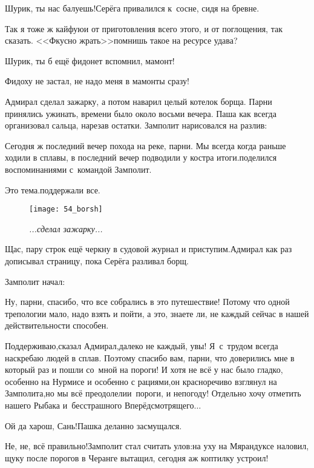 \diagdash Шурик, ты нас балуешь!\mdash Серёга привалился к~сосне, сидя на бревне.

\diagdash Так я тоже ж кайфую\mdash и от приготовления всего этого, и от поглощения, так сказать. <<Фкусно жрать>>\mdash помнишь такое на ресурсе удава?

\diagdash Шурик, ты б ещё фидонет вспомнил, мамонт!

\diagdash Фидоху не застал, не надо меня в мамонты сразу!

Адмирал сделал зажарку, а потом наварил целый котелок борща. Парни принялись ужинать, времени было около восьми вечера. Паша как всегда организовал сальца, нарезав остатки. Замполит нарисовался на разлив:

\diagdash Сегодня ж последний вечер похода на реке, парни. Мы всегда когда раньше ходили в сплавы, в последний вечер подводили у костра итоги.\mdash поделился воспоминаниями с~командой Замполит.

\diagdash Это тема.\mdash поддержали все.

\begin{wrapfigure}[18]{l}{0.50\textwidth}
	\centering
	\texttt{[image: 54\_borsh]}
	\caption{\small\textit{...сделал зажарку...}}
\end{wrapfigure}
\mdash Щас, пару строк ещё черкну в судовой журнал и приступим.\mdash Адмирал как раз дописывал страницу, пока Серёга разливал борщ.

Замполит начал:

\diagdash Ну, парни, спасибо, что все собрались в это путешествие! Потому что одной трепологии мало, надо взять и пойти, а это, знаете ли, не каждый сейчас в нашей действительности способен. %

\diagdash Поддерживаю,\mdash сказал Адмирал,\mdash далеко не каждый, увы! Я~с~трудом всегда наскребаю людей в сплав. Поэтому спасибо вам, парни, что доверились мне в который раз и пошли со~мной на пороги! И хотя не всё у нас было гладко, особенно на Нурмисе и особенно с рациями,\mdash он красноречиво взглянул на Замполита,\mdash но мы всё преодолели\mdash и~пороги, и непогоду! Отдельно хочу отметить нашего Рыбака и~бесстрашного Вперёдсмотрящего$\ldots$

\diagdash Ой да харош, Сань!\mdash Пашка деланно засмущался.

\diagdash Не, не, всё правильно!\mdash Замполит стал считать улов:\mdash на уху на Мярандуксе наловил, щуку после порогов в Черанге вытащил, сегодня аж коптилку устроил!

